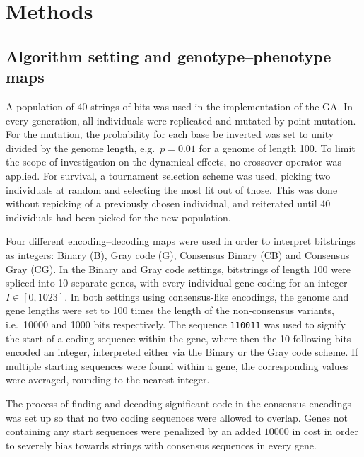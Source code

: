 \documentclass[a4paper,12pt]{article}
\theoremstyle{plain}
\theoremstyle{definition}
\begin{document}
   \section{Methods}
	   \setcounter{equation}{0}
      \subsection{Algorithm setting and genotype--phenotype maps}
         A population of 40 strings of bits was used in the implementation of
         the GA. In every generation, all individuals were replicated and mutated
         by point mutation. 
         For the mutation, the probability for each base be inverted was set to unity divided by the
         genome length, e.g.\ $p=0.01$ for a genome of length 100. 
         To limit the scope of investigation on the dynamical effects, no crossover operator was
         applied. For survival, a tournament
         selection scheme was used, picking two individuals at random and selecting the most fit 
         out of those. This was done without repicking of a previously chosen individual, 
         and reiterated until 40 individuals had been picked for the
         new population.
         
         Four different encoding--decoding maps were used in order to interpret
         bitstrings as integers: Binary (B), Gray code (G),
         Consensus Binary (CB) and Consensus Gray (CG). In the Binary and Gray code 
         settings, bitstrings of length 100 were spliced into 10 separate genes, 
         with every individual gene coding for an integer $I \in \left[0,1023\right]$. 
         In both settings using consensus-like encodings, the genome and gene 
         lengths were set to 100 times the length of the non-consensus variants, 
         i.e.\ 10000 and 1000 bits respectively. The sequence \texttt{110011} was used to
         signify the start of a coding sequence within the gene, where then the 10
         following bits encoded an integer, interpreted either via the Binary or the 
         Gray code scheme. If multiple starting sequences were found within a gene, the 
         corresponding values were averaged, rounding to the nearest integer. 
         
         The process of finding and decoding significant code in the consensus encodings
         was set up so that no two coding sequences were allowed to
         overlap. Genes not containing any start sequences were penalized by
         an added $10000$ in cost in order to severely bias towards strings with consensus
         sequences in every gene. 
\end{document}
